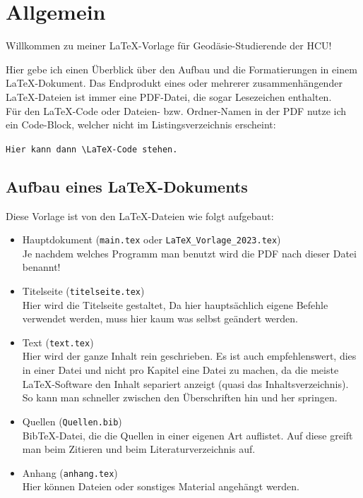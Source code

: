 \section{Allgemein} \label{sec:ersteSec}

Willkommen zu meiner \LaTeX-Vorlage für Geodäsie-Studierende der HCU!

Hier gebe ich einen Überblick über den Aufbau und die Formatierungen in einem \LaTeX-Dokument. Das Endprodukt eines oder mehrerer zusammenhängender \LaTeX-Dateien ist immer eine PDF-Datei, die sogar Lesezeichen enthalten.\\

Für den \LaTeX-Code oder Dateien- bzw. Ordner-Namen in der PDF nutze ich ein Code-Block, welcher nicht im Listingsverzeichnis erscheint:

\verb|Hier kann dann \LaTeX-Code stehen.|


\subsection{Aufbau eines \LaTeX-Dokuments} \label{sec:aufbau}

Diese Vorlage ist von den \LaTeX-Dateien wie folgt aufgebaut:

\begin{itemize}
    \item Hauptdokument (\verb|main.tex| oder \verb|LaTeX_Vorlage_2023.tex|)\\
    Je nachdem welches Programm man benutzt wird die PDF nach dieser Datei benannt!
    \item Titelseite (\verb|titelseite.tex|)\\
    Hier wird die Titelseite gestaltet, Da hier hauptsächlich eigene Befehle verwendet werden, muss hier kaum was selbst geändert werden.
    \item Text (\verb|text.tex|)\\
    Hier wird der ganze Inhalt rein geschrieben. Es ist auch empfehlenswert, dies in einer Datei und nicht pro Kapitel eine Datei zu machen, da die meiste \LaTeX-Software den Inhalt separiert anzeigt (quasi das Inhaltsverzeichnis). So kann man schneller zwischen den Überschriften hin und her springen.
    \item Quellen (\verb|Quellen.bib|)\\
    BibTeX-Datei, die die Quellen in einer eigenen Art auflistet. Auf diese greift man beim Zitieren und beim Literaturverzeichnis auf.
    \item Anhang (\verb|anhang.tex|)\\
    Hier können Dateien oder sonstiges Material angehängt werden.
\end{itemize}

